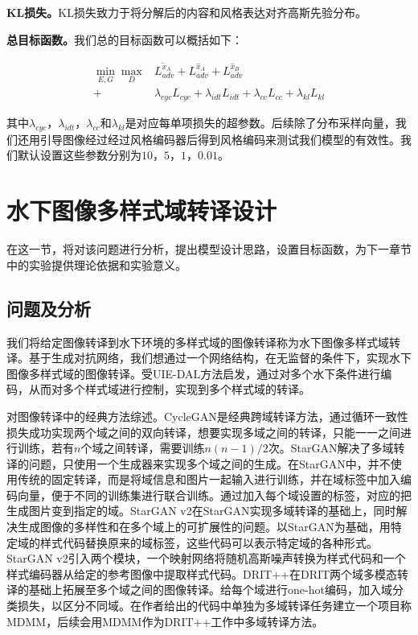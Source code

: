 \textbf{KL损失。}KL损失致力于将分解后的内容和风格表达对齐高斯先验分布。

\textbf{总目标函数。}我们总的目标函数可以概括如下：

\begin{equation}
\label{equ:full}
\begin{aligned}
\min_{E,G}\max_{D} & L_{adv}^{\tilde{x}_A}+L_{adv}^{\hat{x}_A}+L_{adv}^{\hat{x}_B} \\
+&\lambda_{cyc}L_{cyc}+\lambda_{idt}L_{idt}+\lambda_{cc}L_{cc}+\lambda_{kl}L_{kl}
\end{aligned}
\end{equation}

其中$\lambda_{cyc}$，$\lambda_{idt}$，$\lambda_{cc}$和$\lambda_{kl}$是对应每单项损失的超参数。后续除了分布采样向量，我们还用引导图像经过经过风格编码器后得到风格编码来测试我们模型的有效性。我们默认设置这些参数分别为$10$，$5$，$1$，$0.01$。

\section{水下图像多样式域转译设计}
在这一节，将对该问题进行分析，提出模型设计思路，设置目标函数，为下一章节中的实验提供理论依据和实验意义。

\subsection{问题及分析}
我们将给定图像转译到水下环境的多样式域的图像转译称为水下图像多样式域转译。基于生成对抗网络，我们想通过一个网络结构，在无监督的条件下，实现水下图像多样式域的图像转译。受UIE-DAL方法启发，通过对多个水下条件进行编码，从而对多个样式域进行控制，实现到多个样式域的转译。

对图像转译中的经典方法综述。CycleGAN是经典跨域转译方法，通过循环一致性损失成功实现两个域之间的双向转译，想要实现多域之间的转译，只能一一之间进行训练，若有$n$个域之间转译，需要训练$n(n-1)/2$次。StarGAN解决了多域转译的问题，只使用一个生成器来实现多个域之间的生成。在StarGAN中，并不使用传统的固定转译，而是将域信息和图片一起输入进行训练，并在域标签中加入编码向量，便于不同的训练集进行联合训练。通过加入每个域设置的标签，对应的把生成图片变到指定的域。StarGAN v2在StarGAN实现多域转译的基础上，同时解决生成图像的多样性和在多个域上的可扩展性的问题。以StarGAN为基础，用特定域的样式代码替换原来的域标签，这些代码可以表示特定域的各种形式。StarGAN v2引入两个模块，一个映射网络将随机高斯噪声转换为样式代码和一个样式编码器从给定的参考图像中提取样式代码。DRIT++在DRIT两个域多模态转译的基础上拓展至多个域之间的图像转译。给每个域进行one-hot编码，加入域分类损失，以区分不同域。在作者给出的代码中单独为多域转译任务建立一个项目称MDMM，后续会用MDMM作为DRIT++工作中多域转译方法。

